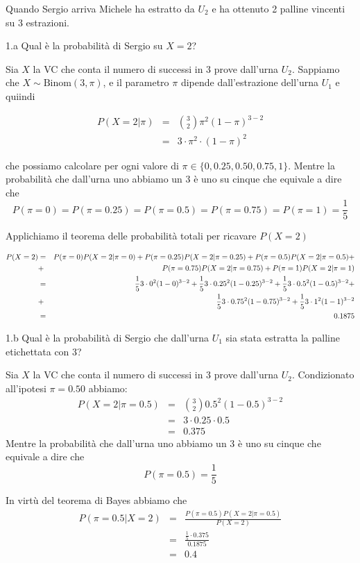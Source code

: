\documentclass[
  11pt,
]{book}
\theoremstyle{mytheoremstyle}
\theoremstyle{mydefstyle}
\newenvironment{sol}
  {
  \begin{tcolorbox}[enhanced,breakable,arc=0.1mm,boxrule=1pt,colback=white,colframe=iblue,
  title=\bf \fontfamily{lmss}\selectfont \hspace{.5 cm} Soluzione,drop fuzzy shadow]

}{
\end{tcolorbox}
  }
\begin{document}
Quando Sergio arriva Michele ha estratto da \(U_2\) e ha ottenuto 2 palline vincenti su 3 estrazioni.

1.a Qual è la probabilità di Sergio su \(X=2\)?

\begin{sol}
Sia \(X\) la VC che conta il numero di successi in 3 prove dall'urna \(U_2\).
Sappiamo che \(X\sim\text{Binom}(3,\pi)\), e il parametro \(\pi\) dipende dall'estrazione dell'urna \(U_1\) e quiindi

\begin{eqnarray*}
  P(X=2|\pi) &=&  \binom{3}{2}\pi^2(1-\pi)^{3-2}\\
                 &=&  3\cdot \pi^2\cdot (1-\pi)^2
\end{eqnarray*}

che possiamo calcolare per ogni valore di \(\pi\in\{0,0.25,0.50,0.75,1\}\).
Mentre la probabilità che dall'urna uno abbiamo un 3 è uno su cinque che equivale a dire che
\[
P(\pi=0)=P(\pi=0.25)=P(\pi=0.5)=P(\pi=0.75)=P(\pi=1)=\frac 15
\]

Applichiamo il teorema delle probabilità totali per ricavare
\(P(X=2)\)

\begin{eqnarray*}
\scriptsize P(X=2)  &=&  \scriptsize P(\pi=0)P(X=2|\pi=0)+P(\pi=0.25)P(X=2|\pi=0.25)+P(\pi=0.5)P(X=2|\pi=0.5)+\\
        &+& \scriptsize P(\pi=0.75)P(X=2|\pi=0.75)+P(\pi=1)P(X=2|\pi=1)\\
 &=&  \scriptsize \frac 15 3\cdot 0^2 (1-0)^{3-2} + \frac 15 3\cdot 0.25^2 (1-0.25)^{3-2} + \frac 15 3\cdot 0.5^2 (1-0.5)^{3-2}+\\
 &+&  \scriptsize \frac 15 3\cdot 0.75^2 (1-0.75)^{3-2} + \frac 15 3\cdot 1^2 (1-1)^{3-2}\\
 &=& \scriptsize 0.1875
\end{eqnarray*}

\end{sol}

1.b Qual è la probabilità di Sergio che dall'urna \(U_1\) sia stata estratta la palline etichettata con 3?

\begin{sol}
Sia \(X\) la VC che conta il numero di successi in 3 prove dall'urna \(U_2\).
Condizionato all'ipotesi \(\pi=0.50\) abbiamo:
\begin{eqnarray*}
  P(X=2|\pi=0.5) &=&  \binom{3}{2}0.5^2(1-0.5)^{3-2}\\
                 &=&  3\cdot 0.25\cdot 0.5\\
                 &=&  0.375
\end{eqnarray*}
Mentre la probabilità che dall'urna uno abbiamo un 3 è uno su cinque che equivale a dire che
\[
P(\pi=0.5)=\frac 15
\]

In virtù del teorema di Bayes abbiamo che
\begin{eqnarray*}
P(\pi=0.5|X=2)   &=&  \frac{P(\pi=0.5)P(X=2|\pi=0.5)}{P(X=2)}\\
                 &=&  \frac{\frac 15 \cdot 0.375}{0.1875}\\
                 &=& 0.4
\end{eqnarray*}

\end{sol}
\end{document}
